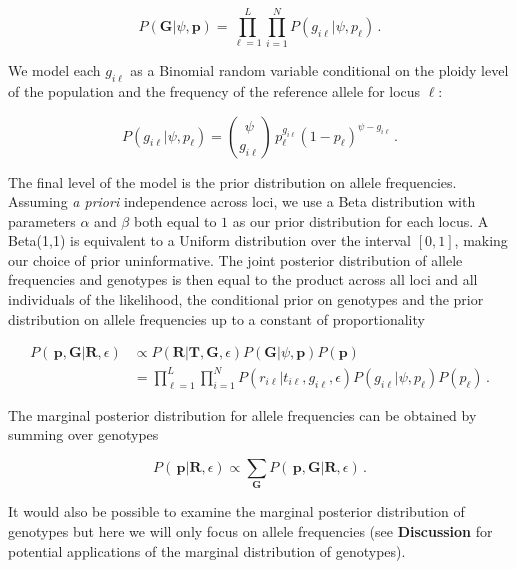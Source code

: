 \documentclass[11pt,english,letterpaper,oneside]{article}
\begin{document}
\begin{equation}\label{condl_prior}
P(\bm{G}|\psi, \bm{p}) = \displaystyle\prod_{\ell=1}^L\displaystyle\prod_{i=1}^N P(g_{i \ell}|\psi, p_{\ell})\,.
\end{equation}

\noindent We model each $g_{i \ell}$ as a Binomial random variable conditional on the ploidy level of the population and the frequency of the reference allele for locus $\ell$:

\begin{equation*}
P(g_{i \ell}|\psi,p_{\ell}) = \binom{\psi}{g_{i \ell}}\,p_{\ell}^{g_{i \ell}}(1-p_{\ell})^{\psi-g_{i \ell}}\,.
\end{equation*}

The final level of the model is the prior distribution on allele frequencies. Assuming \textit{a priori} independence across loci, we use a Beta distribution with parameters $\alpha$ and $\beta$ both equal to $1$ as our prior distribution for each locus. A Beta(1,1) is equivalent to a Uniform distribution over the interval $[0,1]$, making our choice of prior uninformative. The joint posterior distribution of allele frequencies and genotypes is then equal to the product across all loci and all individuals of the likelihood, the conditional prior on genotypes and the prior distribution on allele frequencies up to a constant of proportionality

\begin{align}\label{posterior}
P(\,\bm{p},\bm{G}|\bm{R},\epsilon) &\propto P(\bm{R}|\bm{T},\bm{G}, \epsilon)P(\bm{G}|\psi,\bm{p})P(\bm{p}) \nonumber \\[0.05in]
&= \displaystyle\prod_{\ell=1}^L\displaystyle\prod_{i=1}^N P(r_{i \ell}|t_{i\ell}, g_{i \ell},\epsilon)P(g_{i \ell}|\psi, p_{\ell})P(p_{\ell})\,.
\end{align}

\noindent The marginal posterior distribution for allele frequencies can be obtained by summing over genotypes

\begin{equation}\label{marg_post_p}
P(\,\bm{p}|\bm{R},\epsilon) \propto \displaystyle\sum_{\bm{G}} P(\,\bm{p},\bm{G}|\bm{R},\epsilon)\,.
\end{equation}

\noindent It would also be possible to examine the marginal posterior distribution of genotypes but here we will only focus on allele frequencies (see \textbf{Discussion} for potential applications of the marginal distribution of genotypes).
\end{document}
